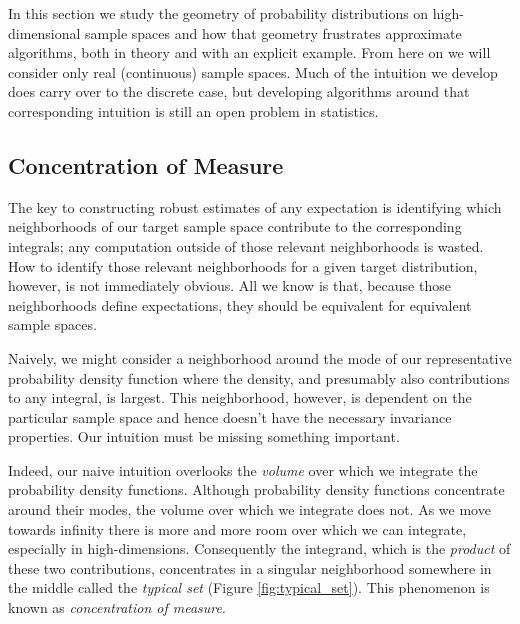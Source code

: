 \documentclass[11pt, oneside]{article}
\begin{document}
In this section we study the geometry of probability distributions
on high-dimensional sample spaces and how that geometry frustrates
approximate algorithms, both in theory and with an explicit example.  
From here on we will consider only real (continuous) sample spaces.
Much of the intuition we develop does carry over to the discrete case, 
but developing algorithms around that corresponding intuition is still an 
open problem in statistics.

\subsection{Concentration of Measure}

The key to constructing robust estimates of any expectation is identifying 
which neighborhoods of our target sample space contribute to the 
corresponding integrals; any computation outside of those relevant 
neighborhoods is wasted.  How to identify those relevant neighborhoods 
for a given target distribution, however, is not immediately obvious.
All we know is that, because those neighborhoods define expectations,
they should be equivalent for equivalent sample spaces.

Naively, we might consider a neighborhood around the mode of our 
representative probability density function where the density, and 
presumably also contributions to any integral, is largest.  This
neighborhood, however, is dependent on the particular sample
space and hence doesn't have the necessary invariance properties.
Our intuition must be missing something important.

Indeed, our naive intuition overlooks the \emph{volume} over which 
we integrate the probability density functions.  Although probability 
density functions concentrate around their modes, the volume over which
we integrate does not.  As we move towards infinity there is more and
more room over which we can integrate, especially in high-dimensions.
Consequently the integrand, which is the \emph{product} of these two 
contributions, concentrates in a singular neighborhood somewhere in the 
middle called the \emph{typical set} (Figure \ref{fig:typical_set}). This
phenomenon is known as \emph{concentration of measure}.
\end{document}
